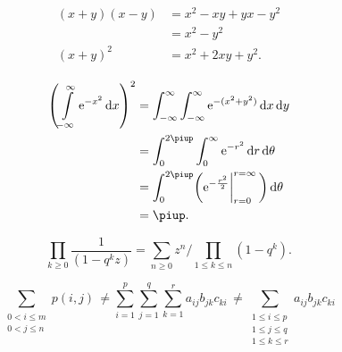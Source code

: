 \documentclass[12pt, a4paper, oneside]{article}
\newcommand{\mathup}[1]{\mathrm{#1}}
\theoremstyle{Plain}
\theoremstyle{Definition}
\theoremstyle{Remark}
\begin{document}
\begin{appendix}


\begin{align*}
\begin{aligned}
(x+y)(x-y)&=x^2-xy+yx-y^2\\
&=x^2-y^2\\
(x+y)^2&=x^2+2xy+y^2.
\end{aligned}
\end{align*}


\begin{align*}
\begin{aligned}
\left( \int\limits_{-\infty}^\infty \mathup{e}^{-x^2}\,\mathup{d}x \right)^2
&=\int_{-\infty}^\infty\int_{-\infty}^\infty \mathup{e}^{-(x^2+y^2)}\,\mathup{d}x\,\mathup{d}y\\
&=\int_0^{2\piup}\int_0^\infty \mathup{e}^{-r^2}\,\mathup{d}r\,\mathup{d}\theta\\
&=\int_0^{2\piup}\biggl(\mathup{e}^{-\frac{r^2}{2}}\biggl|_{r=0}^{r=\infty}\,\biggr)\,\mathup{d}\theta\\
&=\piup.
\end{aligned}
\end{align*}



$$\prod_{k\ge0}\frac{1}{(1-q^kz)}=
\sum_{n\ge0}z^n \bigg/ \!\!\prod_{1\le k\le n}(1-q^k).$$

$$\sum_{\substack{\scriptstyle 0< i\le m\\\scriptstyle0<j\le n}}p(i,j) \,\ne
%
%
\sum_{i=1}^p \sum_{j=1}^q \sum_{k=1}^r a_{ij} b_{jk} c_{ki} \,\ne
%
\sum_{\substack{\scriptstyle 1\le i\le p \\ \scriptstyle 1\le j\le q\\
		\scriptstyle 1\le k\le r}} a_{ij} b_{jk} c_{ki}$$


\end{appendix}
\end{document}
